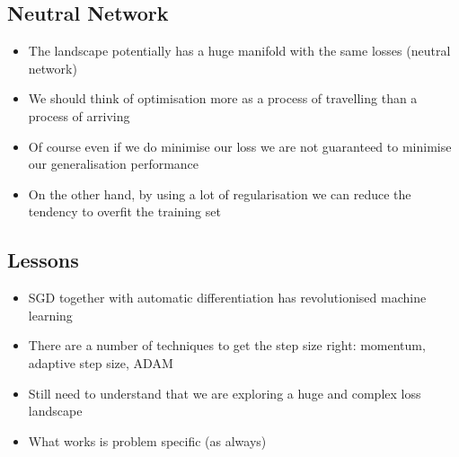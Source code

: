 
\begin{slide}
\section{Neutral Network}

\begin{PauseHighLight}
  \begin{itemize}
  \item The landscape potentially has a huge manifold with the same
    losses (neutral network)\pause
  \item We should think of optimisation more as a process of
    travelling than a process of arriving\pause
  \item Of course even if we do minimise our loss we are not
    guaranteed to minimise our generalisation performance\pause
  \item On the other hand, by using a lot of regularisation we can
    reduce the tendency to overfit the training set\pause
  \end{itemize}
\end{PauseHighLight}

\end{slide}


\begin{slide}
\section{Lessons}

\begin{PauseHighLight}
  \begin{itemize}
  \item SGD together with automatic differentiation has revolutionised
    machine learning\pause
  \item There are a number of techniques to get the step size
    right\pause: momentum\pauseb, adaptive step size\pauseb,
    ADAM\pauseb
  \item Still need to understand that we are exploring a huge and
    complex loss landscape\pause
  \item What works is problem specific\pause{} (as always)\pauseb
  \end{itemize}
\end{PauseHighLight}

\end{slide}

